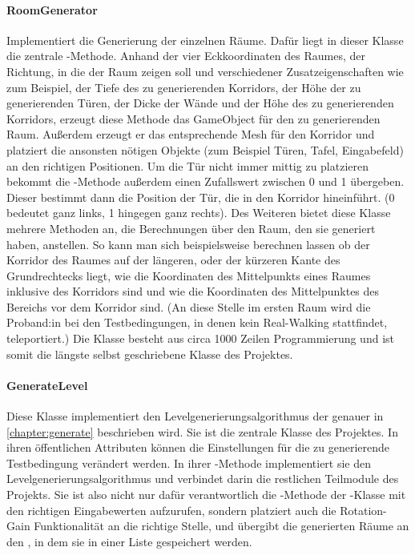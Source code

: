 \begin{multicols*}{2}
    \paragraph{RoomGenerator}
    Implementiert die Generierung der einzelnen Räume. Dafür liegt in dieser Klasse die zentrale -Methode. Anhand der vier Eckkoordinaten des Raumes, der Richtung, in die der Raum zeigen soll und verschiedener Zusatzeigenschaften wie zum Beispiel, der Tiefe des zu generierenden Korridors, der Höhe der zu generierenden Türen, der Dicke der Wände und der Höhe des zu generierenden Korridors, erzeugt diese Methode das GameObject für den zu generierenden Raum. Außerdem erzeugt er das entsprechende Mesh für den Korridor und platziert die ansonsten nötigen Objekte (zum Beispiel Türen, Tafel, Eingabefeld) an den richtigen Positionen. Um die Tür nicht immer mittig zu platzieren bekommt die -Methode außerdem einen Zufallswert zwischen 0 und 1 übergeben. Dieser bestimmt dann die Position der Tür, die in den Korridor hineinführt. (0 bedeutet ganz links, 1 hingegen ganz rechts).
    Des Weiteren bietet diese Klasse mehrere Methoden an, die Berechnungen über den Raum, den sie generiert haben, anstellen. So kann man sich beispielsweise berechnen lassen ob der Korridor des Raumes auf der längeren, oder der kürzeren Kante des Grundrechtecks liegt, wie die Koordinaten des Mittelpunkts eines Raumes inklusive des Korridors sind und wie die Koordinaten des Mittelpunktes des Bereichs vor dem Korridor sind. (An diese Stelle im ersten Raum wird die Proband:in bei den Testbedingungen, in denen kein Real-Walking stattfindet, teleportiert.) Die Klasse besteht aus circa 1000 Zeilen Programmierung und ist somit die längste selbst geschriebene Klasse des Projektes.

    \paragraph{GenerateLevel}
    Diese Klasse implementiert den Levelgenerierungsalgorithmus der genauer in \autoref{chapter:generate}
    beschrieben wird. Sie ist die zentrale Klasse des Projektes. In ihren öffentlichen Attributen können die Einstellungen für die zu generierende Testbedingung verändert werden. In ihrer -Methode implementiert sie den Levelgenerierungsalgorithmus und verbindet darin die restlichen Teilmodule des Projekts. Sie ist also nicht nur dafür verantwortlich die -Methode der -Klasse mit den richtigen Eingabewerten aufzurufen, sondern platziert auch die Rotation-Gain Funktionalität an die richtige Stelle, und übergibt die generierten Räume an den , in dem sie in einer Liste gespeichert werden.


\end{multicols*}
